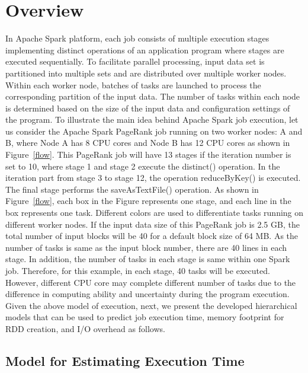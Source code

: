 \section{Overview}
\label{overview}

\noindent
In Apache Spark platform, each job consists of multiple execution stages implementing distinct operations of an application program where stages are executed sequentially. To facilitate parallel processing, input data set is partitioned into multiple sets and are distributed over multiple worker nodes. Within each worker node, batches of tasks are launched to process the corresponding partition of the input data. The number of tasks within each node is determined based on the size of the input data and configuration settings of the program. 
\noindent
To illustrate the main idea behind Apache Spark job execution, let us consider the Apache Spark PageRank job running on two worker nodes: A and B, where Node A has 8 CPU cores and Node B has 12 CPU cores as shown in Figure~\ref{flow}. This PageRank job will have 13 stages if the iteration number is set to 10, where stage 1 and stage 2 execute the distinct() operation. In the iteration part from stage 3 to stage 12, the operation reduceByKey() is executed. The final stage performs the saveAsTextFile() operation. As shown in Figure~\ref{flow}, each box in the Figure represents one stage, and each line in the box represents one task. Different colors are used to differentiate tasks running on different worker nodes. If the input data size of this PageRank job is 2.5 GB, the total number of input blocks will be 40 for a default block size of 64 MB. As the number of tasks is same as the input block number, there are 40 lines in each stage. In addition, the number of tasks in each stage is same within one Spark job. Therefore, for this example, in each stage, 40 tasks will be executed. However, different CPU core may complete different number of tasks due to the difference in computing ability and uncertainty during the program execution. 
\noindent
Given the above model of execution, next, we present the developed hierarchical models that can be used to predict job execution time, memory footprint for RDD creation, and I/O overhead as follows. 


\subsection{Model for Estimating Execution Time}

